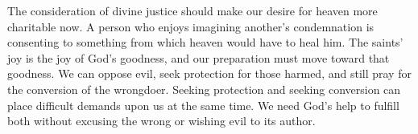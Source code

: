 The consideration of divine justice should make our desire for heaven more charitable now. A person who enjoys imagining another's condemnation is consenting to something from which heaven would have to heal him. The saints' joy is the joy of God's goodness, and our preparation must move toward that goodness. We can oppose evil, seek protection for those harmed, and still pray for the conversion of the wrongdoer. Seeking protection and seeking conversion can place difficult demands upon us at the same time. We need God's help to fulfill both without excusing the wrong or wishing evil to its author.

